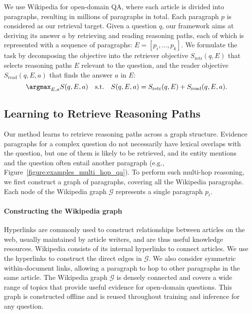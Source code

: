 \fi

We use Wikipedia for open-domain QA, where each article is divided into paragraphs, resulting in millions of paragraphs in total.
Each paragraph $p$ is considered as our retrieval target.
Given a question $q$, our framework aims at deriving its answer $a$ by retrieving and reading reasoning paths, each of which is represented with a sequence of paragraphs: $E = [p_i, \ldots, p_k]$.
We formulate the task by decomposing the objective into the retriever objective $S_\mathrm{retr}(q, E)$ that selects reasoning paths $E$ relevant to the question, and the reader objective $S_\mathrm{read}(q, E, a)$ that finds the answer $a$ in $E$:
\begin{equation}
\label{eq:task_def}
    \argmax_{E, a}S(q, E, a) ~~~\mathrm{s.t.}~~~ S(q, E, a) = S_\mathrm{retr}(q, E) + S_\mathrm{read}(q, E, a).
\end{equation}  

\subsection{Learning to Retrieve Reasoning Paths}
\label{sec:retriever}
Our method learns to retrieve reasoning paths across a graph structure. 
Evidence paragraphs for a complex question do not necessarily have lexical overlaps with the question, but one of them is likely to be retrieved, and its entity mentions and the question often entail another paragraph (e.g., Figure~\ref{figure:examples_multi_hop_qa}).
To perform such multi-hop reasoning, we first construct a graph of paragraphs, covering all the Wikipedia paragraphs.
Each node of the Wikipedia graph $\mathcal{G}$ represents a single paragraph $p_i$.

\vspace{-2mm}\paragraph{Constructing the Wikipedia graph}
Hyperlinks are commonly used to construct relationships between articles on the web, usually maintained by article writers, and are thus useful knowledge resources.
Wikipedia consists of its internal hyperlinks to connect articles. 
We use the hyperlinks to construct the direct edges in $\mathcal{G}$.
We also consider symmetric within-document links, allowing a paragraph to hop to other paragraphs in the same article.
The Wikipedia graph $\mathcal{G}$ is densely connected and covers a wide range of topics that provide useful evidence for open-domain questions.
This graph is constructed offline and is reused throughout training and inference for any question.

